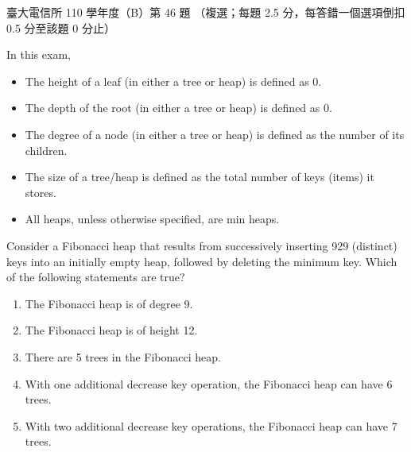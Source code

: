 \begin{pastexam}[label={px:ntu-110-comm-dsa-46}]{臺大電信所 110 學年度（B）第 46 題}
（複選；每題 2.5 分，每答錯一個選項倒扣 0.5 分至該題 0 分止）

In this exam,
\begin{itemize}
\item The height of a leaf (in either a tree or heap) is defined as 0.
\item The depth of the root (in either a tree or heap) is defined as 0.
\item The degree of a node (in either a tree or heap) is defined as the number of its children.
\item The size of a tree/heap is defined as the total number of keys (items) it stores.
\item All heaps, unless otherwise specified, are min heaps.
\end{itemize}

Consider a Fibonacci heap that results from successively inserting 929 (distinct) keys into an initially empty heap, followed by deleting the minimum key. Which of the following statements are true?
\begin{enumerate}[label=\Alph*.]
\item The Fibonacci heap is of degree 9.
\item The Fibonacci heap is of height 12.
\item There are 5 trees in the Fibonacci heap.
\item With one additional decrease key operation, the Fibonacci heap can have 6 trees.
\item With two additional decrease key operations, the Fibonacci heap can have 7 trees.
\end{enumerate}
\end{pastexam}

